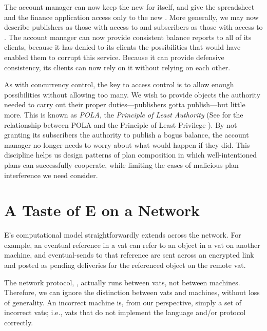\documentclass{llncs}
\begin{document}
The account manager can now keep the new  for
itself, and give the spreadsheet and the finance application access
only to the new . More generally, we may now
describe publishers as those with access to  and
subscribers as those with access to . The account
manager can now provide consistent balance reports to all of its
clients, because it has denied to its clients the possibilities that
would have enabled them to corrupt this service. Because it can
provide defensive consistency, its clients can now rely on it without
relying on each other.

As with concurrency control, the key to access control is to allow
enough possibilities without allowing too many. We wish to provide
objects the authority needed to carry out their proper
duties---publishers gotta publish---but little more. This is known as
\emph{POLA}, the \emph{Principle of Least Authority} (See
\cite{miller:paradigm} for the relationship between POLA and the
Principle of Least Privilege \cite{SaltzerSc75}). By not granting its
subscribers the authority to publish a bogus balance, the account
manager no longer needs to worry about what would happen if they
did. This discipline helps us design patterns of plan composition in
which well-intentioned plans can successfully cooperate, while
limiting the cases of malicious plan interference we need
consider. 


\section{A Taste of E on a Network}


E's computational model straightforwardly extends across the network.
For example, an eventual reference in a vat can refer to an object in
a vat on another machine, and eventual-sends to that reference are
sent across an encrypted link and posted as pending deliveries for the
referenced object on the remote vat.  

The network protocol, , actually runs between vats, not
between machines. Therefore, we can ignore the distinction between vats
and machines, without loss of generality. An incorrect machine is,
from our perspective, simply a set of incorrect vats; i.e., vats that
do not implement the language and/or protocol correctly.
\end{document}
